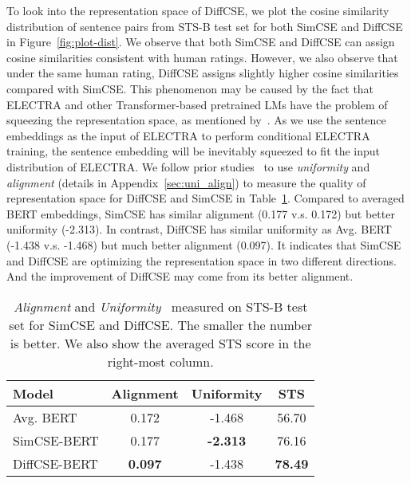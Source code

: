 \documentclass[11pt]{article}
\newcommand{\ba}{\xspace}
\begin{document}
To look into the representation space of DiffCSE, we plot the cosine similarity distribution of sentence pairs from STS-B test set for both SimCSE and DiffCSE in Figure~\ref{fig:plot-dist}. We observe that both SimCSE and DiffCSE can assign cosine similarities consistent with human ratings. However, we also observe that under the same human rating, DiffCSE assigns slightly higher cosine similarities compared with SimCSE. This phenomenon may be caused by the fact that ELECTRA and other Transformer-based pretrained LMs have the problem of squeezing the representation space, as mentioned by~\citet{meng2021coco}. As we use the sentence embeddings as the input of ELECTRA to perform conditional ELECTRA training, the sentence embedding will be inevitably squeezed to fit the input distribution of ELECTRA. We follow prior studies~\cite{wang2020understanding, gao2021simcse} to use \emph{uniformity} and \emph{alignment} (details in Appendix~\ref{sec:uni_align}) to measure the quality of representation space for DiffCSE and SimCSE in Table~\ref{tab:uni_align}. Compared to averaged BERT embeddings, SimCSE has similar alignment (0.177 v.s. 0.172) but better uniformity (-2.313). In contrast, DiffCSE has similar uniformity as Avg. BERT (-1.438 v.s. -1.468) but much better alignment (0.097). It indicates that SimCSE and DiffCSE are optimizing the representation space in two different directions. And the improvement of DiffCSE may come from its better alignment.

\begin{table}[t]
    \begin{center}
    \centering
    \small
    \begin{tabular}{l|cc|c}
    \toprule
       \bf Model & \bf Alignment & \bf Uniformity & \bf STS \\
    \midrule
        Avg. BERT\ba & 0.172 & -1.468 & 56.70 \\
        SimCSE-BERT\ba & 0.177 & \bf -2.313 & 76.16 \\
        DiffCSE-BERT\ba & \bf 0.097 & -1.438 & \bf 78.49 \\
    \bottomrule
    \end{tabular}
    \end{center}
    \vspace{-2mm}
    \caption{
        \emph{Alignment} and \emph{Uniformity}~\cite{wang2020understanding} measured on STS-B test set for SimCSE and DiffCSE. The smaller the number is better. We also show the averaged STS score in the right-most column.
    }
    \label{tab:uni_align}
    \vspace{-3mm}
\end{table}
\end{document}
